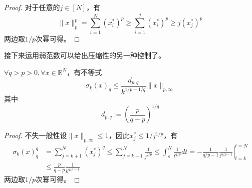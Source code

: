\begin{proof}
    对于任意的$j \in [N]$，有
    \begin{equation}
        \|x\|_p^p=\sum_{i=1}^N\left(x_i^*\right)^p \geq \sum_{i=1}^j\left(x_i^*\right)^p \geq j\left(x_j^*\right)^p
    \end{equation}
    两边取$1/p$次幂可得。
\end{proof}
接下来运用弱范数可以给出压缩性的另一种控制了。
\begin{theorem}
    $\forall q>p>0,\forall x\in \mathbb{R}^N$，有不等式
    \begin{equation}
        \sigma_k(x)_q \leq \frac{d_{p, q}}{k^{1 / p-1 / q}}\|x\|_{p, \infty}
    \end{equation}
    其中
    \begin{equation}
        d_{p, q}:=\left(\frac{p}{q-p}\right)^{1 / q}
    \end{equation}
\end{theorem}
\begin{proof}
    不失一般性设$\|x\|_{p, \infty}\le 1$，因此$x^*_j\le 1/j^{1/p}$，有
    \begin{equation}
        \begin{aligned}
        \sigma_k(x)_q^q & =\sum_{j=k+1}^N\left(x_j^*\right)^q \leq \sum_{j=k+1}^N \frac{1}{j^{q / p}} \leq \int_s^N \frac{1}{t^{q / p}} d t=-\left.\frac{1}{q / p-1} \frac{1}{t^{q / p-1}}\right|_{t=k} ^{t=N} \\
        & \leq \frac{p}{q-p} \frac{1}{k^{q / p-1}} 
        \end{aligned}
        \end{equation}
        两边取$1/p$次幂可得。
\end{proof}

